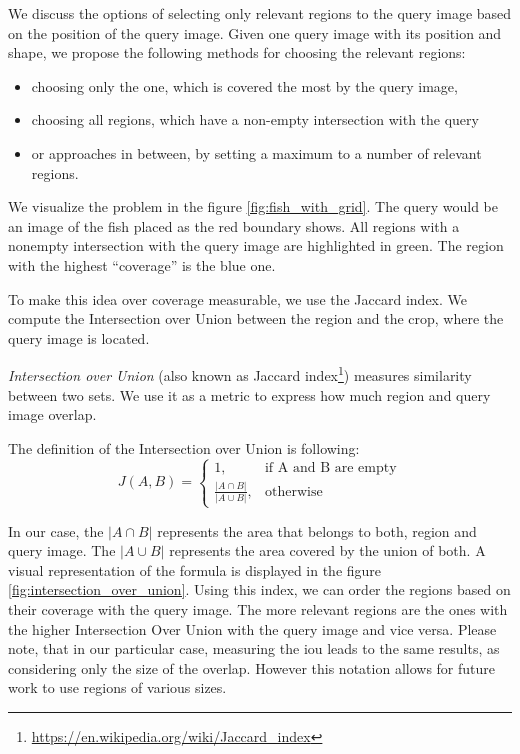 We discuss the options of selecting only relevant regions to the query image based on the position of the query image. Given one query image with its position and shape, we propose the following methods for choosing the relevant regions:
\begin{itemize}
  \item choosing only the one, which is covered the most by the query image,
  \item choosing all regions, which have a non-empty intersection with the query
  \item or approaches in between, by setting a maximum to a number of relevant regions.
\end{itemize}

We visualize the problem in the figure \ref{fig:fish_with_grid}. The query would be an image of the fish placed as the red boundary shows. All regions with a nonempty intersection with the query image are highlighted in green. The region with the highest ``coverage'' is the blue one.

To make this idea over coverage measurable, we use the Jaccard index. We compute the Intersection over Union between the region and the crop, where the query image is located. 

\emph{Intersection over Union} (also known as Jaccard index\footnote{\href{https://en.wikipedia.org/wiki/Jaccard_index}{https://en.wikipedia.org/wiki/Jaccard\_index}}) measures similarity between two sets. We use it as a metric to express how much region and query image overlap. 

The definition of the Intersection over Union is following:
$$
    J(A, B) = 
    \begin{cases}
      1, & \text{if\ A and B are empty} \\
      \frac{|A \cap B|}{|A \cup B|}, & \text{otherwise}
    \end{cases}
$$

In our case, the $|A \cap B|$ represents the area that belongs to both, region and query image. The  $|A \cup B|$ represents the area covered by the union of both. A visual representation of the formula is displayed in the figure \ref{fig:intersection_over_union}. Using this index, we can order the regions based on their coverage with the query image. The more relevant regions are the ones with the higher Intersection Over Union with the query image and vice versa. Please note, that in our particular case, measuring the \acrshort{iou} leads to the same results, as considering only the size of the overlap. However this notation allows for future work to use regions of various sizes.

